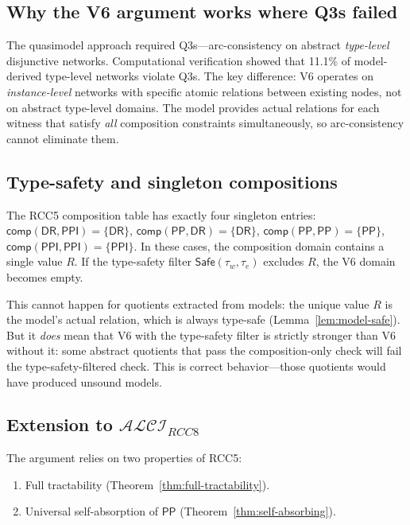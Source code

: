 \documentclass[a4paper,11pt]{article}
\theoremstyle{definition}
\newcommand{\ALCIRCC}[1]{\ensuremath{\mathcal{ALCI}_{\mathit{RCC#1}}}}
\newcommand{\DR}{\ensuremath{\mathsf{DR}}}
\newcommand{\PP}{\ensuremath{\mathsf{PP}}}
\newcommand{\PPI}{\ensuremath{\mathsf{PPI}}}
\newcommand{\comp}{\ensuremath{\mathsf{comp}}}
\newcommand{\Safe}{\ensuremath{\mathsf{Safe}}}
\begin{document}
\subsection{Why the V6 argument works where Q3s failed}

The quasimodel approach required Q3s---arc-consistency on abstract
\emph{type-level} disjunctive networks.  Computational verification
showed that 11.1\% of model-derived type-level networks violate Q3s.
The key difference: V6 operates on \emph{instance-level} networks
with specific atomic relations between existing nodes, not on
abstract type-level domains.  The model provides actual relations for
each witness that satisfy \emph{all} composition constraints
simultaneously, so arc-consistency cannot eliminate them.

\subsection{Type-safety and singleton compositions}

The RCC5 composition table has exactly four singleton entries:
$\comp(\DR, \PPI) = \{\DR\}$,
$\comp(\PP, \DR) = \{\DR\}$,
$\comp(\PP, \PP) = \{\PP\}$,
$\comp(\PPI, \PPI) = \{\PPI\}$.
In these cases, the composition domain contains a single value $R$.
If the type-safety filter $\Safe(\tau_w, \tau_e)$ excludes $R$, the
V6 domain becomes empty.

This cannot happen for quotients extracted from models: the unique
value $R$ is the model's actual relation, which is always type-safe
(Lemma~\ref{lem:model-safe}).  But it \emph{does} mean that V6 with
the type-safety filter is strictly stronger than V6 without it:
some abstract quotients that pass the composition-only check will fail
the type-safety-filtered check.  This is correct behavior---those
quotients would have produced unsound models.

\subsection{Extension to $\ALCIRCC{8}$}

The argument relies on two properties of RCC5:
\begin{enumerate}
\item Full tractability (Theorem~\ref{thm:full-tractability}).
\item Universal self-absorption of $\PP$
  (Theorem~\ref{thm:self-absorbing}).
\end{enumerate}
\end{document}
